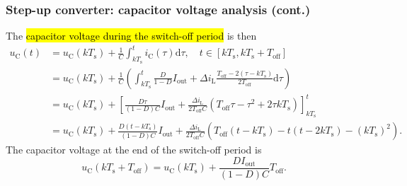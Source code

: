 \begin{frame}
    \frametitle{Step-up converter: capacitor voltage analysis (cont.)}
     The \hl{capacitor voltage during the switch-off period} is then
  \begin{equation}
      \begin{split}
          u_\mathrm{C}(t) &= u_\mathrm{C}(kT_\mathrm{s}) + \frac{1}{C}\int_{kT_\mathrm{s}}^t i_\mathrm{C}(\tau) \mathrm{d}\tau , \quad t\in [k T_\mathrm{s}, k T_\mathrm{s} + T_\mathrm{off}]\\
          &= u_\mathrm{C}(kT_\mathrm{s}) + \frac{1}{C}\left(\int_{kT_\mathrm{s}}^{t} \frac{D}{1-D}I_\mathrm{out} + \Delta i_\mathrm{L} \frac{T_\mathrm{off}-2(\tau-kT_\mathrm{s})}{2T_\mathrm{off}}\mathrm{d}\tau\right)\\
            &= u_\mathrm{C}(kT_\mathrm{s}) + \left[\frac{D\tau}{(1-D)C}I_\mathrm{out} + \frac{\Delta i_\mathrm{L}}{2T_\mathrm{off}C}\left(T_\mathrm{off}\tau - \tau^2 + 2\tau k T_\mathrm{s}\right)\right]_{kT_\mathrm{s}}^t\\
            &= u_\mathrm{C}(kT_\mathrm{s}) + \frac{D(t-kT_\mathrm{s})}{(1-D)C}I_\mathrm{out} + \frac{\Delta i_\mathrm{L}}{2T_\mathrm{off}C}\left(T_\mathrm{off}(t-kT_\mathrm{s}) - t(t-2kT_\mathrm{s})-(kT_\mathrm{s})^2\right).
      \end{split}
      \label{eq:capacitor-voltage-switch-off-step-up-converter}
  \end{equation}
  The capacitor voltage at the end of the switch-off period is
    \begin{equation}
        u_\mathrm{C}(kT_\mathrm{s}+T_\mathrm{off}) = u_\mathrm{C}(kT_\mathrm{s}) + \frac{DI_\mathrm{out}}{(1-D)C}T_\mathrm{off}.
    \end{equation}
\end{frame}

